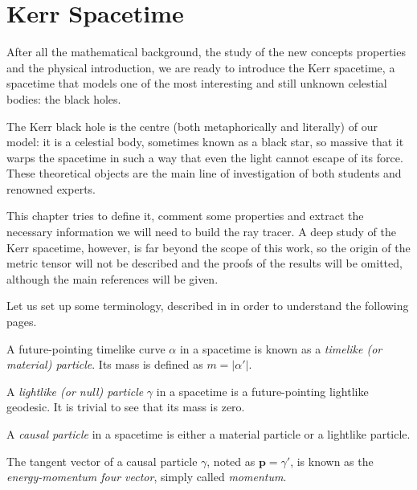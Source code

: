 \chapter{Kerr Spacetime}

After all the mathematical background, the study of the new concepts properties and the physical introduction, we are ready to introduce the Kerr spacetime, a spacetime that models one of the most interesting and still unknown celestial bodies: the black holes.

The Kerr black hole is the centre (both metaphorically and literally) of our model: it is a celestial body, sometimes known as a black star, so massive that it warps the spacetime in such a way that even the light cannot escape of its force. These theoretical objects are the main line of investigation of both students and renowned experts.

This chapter tries to define it, comment some properties and extract the necessary information we will need to build the ray tracer. A deep study of the Kerr spacetime, however, is far beyond the scope of this work, so the origin of the metric tensor will not be described and the proofs of the results will be omitted, although the main references will be given.

Let us set up some terminology, described in \cite[Def. 1.6.2, 1.6.3]{oneill95} in order to understand the following pages.

\begin{definition}
	A future-pointing timelike curve $\alpha$ in a spacetime is known as a \emph{timelike (or material) particle}. Its mass is defined as $m = \vert \alpha' \vert$.
\end{definition}

\begin{definition}
	A \emph{lightlike (or null) particle} $\gamma$ in a spacetime is a future-pointing lightlike geodesic. It is trivial to see that its mass is zero.
\end{definition}

\begin{definition}
	A \emph{causal particle} in a spacetime is either a material particle or a lightlike particle.
\end{definition}

The tangent vector of a causal particle $\gamma$, noted as $\mathbf{p} = \gamma'$, is known as the \emph{energy-momentum four vector}, simply called \emph{momentum}.

